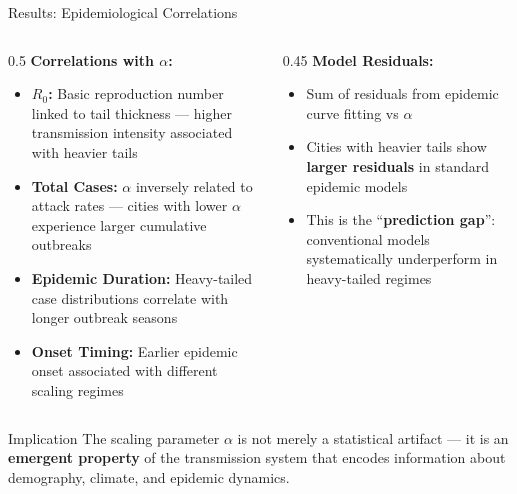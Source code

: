 \documentclass[10pt,aspectratio=169]{beamer}
\begin{document}
\begin{frame}{Results: Epidemiological Correlations}
\begin{columns}[T]
\begin{column}{0.5\textwidth}
\textbf{Correlations with $\alpha$:}
\begin{itemize}
    \item \textbf{$R_0$:} Basic reproduction number linked to tail thickness --- higher transmission intensity associated with heavier tails
    \item \textbf{Total Cases:} $\alpha$ inversely related to attack rates --- cities with lower $\alpha$ experience larger cumulative outbreaks
    \item \textbf{Epidemic Duration:} Heavy-tailed case distributions correlate with longer outbreak seasons
    \item \textbf{Onset Timing:} Earlier epidemic onset associated with different scaling regimes
\end{itemize}
\end{column}

\begin{column}{0.45\textwidth}
\textbf{Model Residuals:}
\begin{itemize}
    \item Sum of residuals from epidemic curve fitting vs $\alpha$
    \item Cities with heavier tails show \textbf{larger residuals} in standard epidemic models
    \item This is the ``\textbf{prediction gap}'': conventional models systematically underperform in heavy-tailed regimes
\end{itemize}
\end{column}
\end{columns}

\vspace{0.3cm}

\begin{block}{Implication}
The scaling parameter $\alpha$ is not merely a statistical artifact --- it is an \textbf{emergent property} of the transmission system that encodes information about demography, climate, and epidemic dynamics.
\end{block}
\end{frame}
\end{document}
